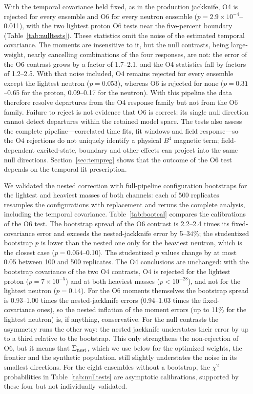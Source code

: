 \documentclass[aps,prd,reprint,twocolumn,superscriptaddress,nofootinbib,longbibliography]{revtex4-2}
\begin{document}
With the temporal covariance held fixed, as in the production jackknife, O4 is rejected for every ensemble and O6 for every neutron ensemble ($p=2.9\times10^{-4}$--0.011), with the two lightest proton O6 tests near the five-percent boundary (Table~\ref{tab:nulltests}). These statistics omit the noise of the estimated temporal covariance. The moments are insensitive to it, but the null contrasts, being large-weight, nearly cancelling combinations of the four responses, are not: the error of the O6 contrast grows by a factor of 1.7--2.1, and the O4 statistics fall by factors of 1.2--2.5. With that noise included, O4 remains rejected for every ensemble except the lightest neutron ($p=0.053$), whereas O6 is rejected for none ($p=0.31$--0.65 for the proton, 0.09--0.17 for the neutron). With this pipeline the data therefore resolve departures from the O4 response family but not from the O6 family. Failure to reject is not evidence that O6 is correct: its single null direction cannot detect departures within the retained model space. The tests also assess the complete pipeline---correlated time fits, fit windows and field response---so the O4 rejections do not uniquely identify a physical $B^4$ magnetic term; field-dependent excited-state, boundary and other effects can project into the same null directions. Section~\ref{sec:tempreg} shows that the outcome of the O6 test depends on the temporal fit prescription.

We validated the nested correction with full-pipeline configuration bootstraps for the lightest and heaviest masses of both channels: each of 500 replicates resamples the configurations with replacement and reruns the complete analysis, including the temporal covariance. Table~\ref{tab:bootcal} compares the calibrations of the O6 test. The bootstrap spread of the O6 contrast is 2.2--2.4 times its fixed-covariance error and exceeds the nested-jackknife error by 5--34\%; the studentized bootstrap $p$ is lower than the nested one only for the heaviest neutron, which is the closest case ($p=0.054$--0.10). The studentized $p$ values change by at most 0.05 between 100 and 500 replicates. The O4 conclusions are unchanged: with the bootstrap covariance of the two O4 contrasts, O4 is rejected for the lightest proton ($p=7\times10^{-5}$) and at both heaviest masses ($p<10^{-28}$), and not for the lightest neutron ($p=0.14$). For the O6 moments themselves the bootstrap spread is 0.93--1.00 times the nested-jackknife errors (0.94--1.03 times the fixed-covariance ones), so the nested inflation of the moment errors (up to 11\% for the lightest neutron) is, if anything, conservative. For the null contrasts the asymmetry runs the other way: the nested jackknife understates their error by up to a third relative to the bootstrap. This only strengthens the non-rejection of O6, but it means that $\Sigma_{\rm nest}$, which we use below for the optimized weights, the frontier and the synthetic population, still slightly understates the noise in its smallest directions. For the eight ensembles without a bootstrap, the $\chi^2$ probabilities in Table~\ref{tab:nulltests} are asymptotic calibrations, supported by these four but not individually validated.
\end{document}
